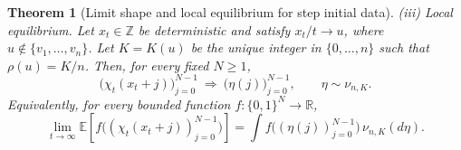 \documentclass[11pt,a4paper]{amsart}
\newtheorem{theorem}{Theorem}[section]
\theoremstyle{definition}
\theoremstyle{remark}
\numberwithin{equation}{section}
\newcommand{\Z}{\mathbb Z}
\newcommand{\R}{\mathbb R}
\newcommand{\Ee}{\mathbb E}
\begin{document}
\begin{theorem}[Limit shape and local equilibrium for step initial data]
		\smallskip
		\noindent\emph{(iii) Local equilibrium.}
		Let $x_t\in\Z$ be deterministic and satisfy $x_t/t\to u$, where
		$u\notin\{v_1,\ldots,v_n\}$.  Let $K=K(u)$ be the unique integer in
		$\{0,\ldots,n\}$ such that $\rho(u)=K/n$.  Then, for every fixed
		$N\ge1$,
		\begin{equation}\label{eq:local-equilibrium}
			\bigl(\chi_t(x_t+j)\bigr)_{j=0}^{N-1}
			\ \Longrightarrow\ 
			\bigl(\eta(j)\bigr)_{j=0}^{N-1},
			\qquad \eta\sim\nu_{n,K}.
		\end{equation}
		Equivalently, for every bounded function $f:\{0,1\}^N\to\R$,
		\begin{equation}\label{eq:local-equilibrium-test-functions}
			\lim_{t\to\infty}
			\Ee\left[f\bigl((\chi_t(x_t+j))_{j=0}^{N-1}\bigr)\right]
			=\int f\bigl((\eta(j))_{j=0}^{N-1}\bigr)\,\nu_{n,K}(d\eta).
		\end{equation}
	\end{theorem}
	
\end{document}
